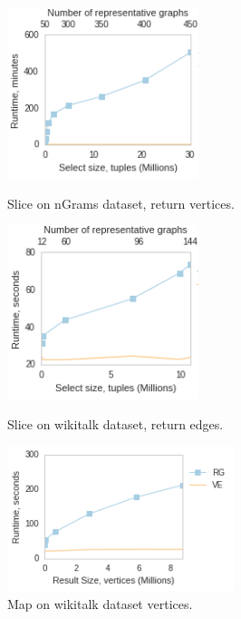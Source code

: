 \begin{figure}
\centering
\begin{minipage}{2.2in}
\centering
\includegraphics[width=2.2in]{figs/slice_ngrams_vertices_build11_trimmed.png}
\vspace{-0.1in}
\caption{Slice on nGrams dataset, return vertices.}
\label{fig:sliceverts}
\vspace{-0.1in}
\end{minipage}
\begin{minipage}{2.2in}
\centering
\includegraphics[width=2.2in]{figs/slice_wikitalk_edges_build11_trimmed.png}
\vspace{-0.1in}
\caption{Slice on wikitalk dataset, return edges.}
\label{fig:sliceedges}
\vspace{-0.1in}
\end{minipage}
\begin{minipage}{2.2in}
\centering
\includegraphics[width=2.6in]{figs/project_wikitalk_vertices_build12.png}
\vspace{-0.1in}
\caption{Map on wikitalk dataset vertices.}
\label{fig:project}
\vspace{-0.1in}
\end{minipage}
\end{figure}

